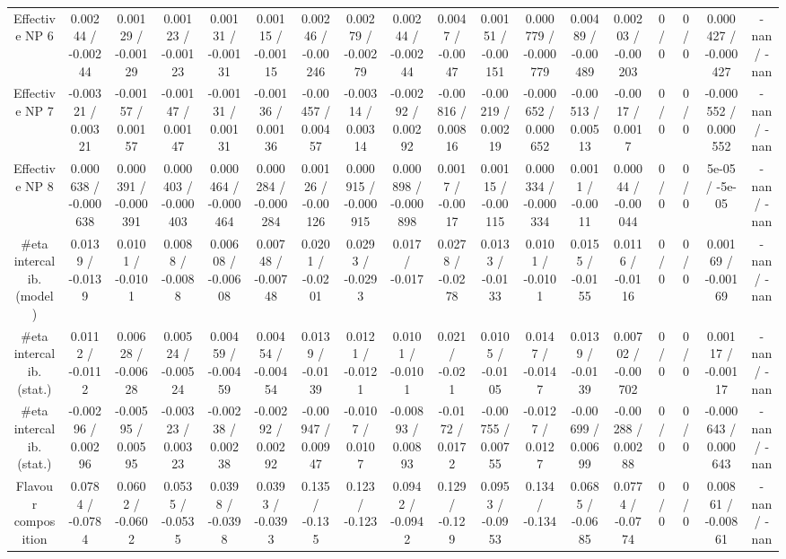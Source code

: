 \documentclass[10pt]{article}
\begin{document}
\begin{table}[htbp]
\begin{center}
\begin{tabular}{|c|c|c|c|c|c|c|c|c|c|c|c|c|c|c|c|c|c|}
  Effective NP 6 & 0.00244 / -0.00244 & 0.00129 / -0.00129 & 0.00123 / -0.00123 & 0.00131 / -0.00131 & 0.00115 / -0.00115 & 0.00246 / -0.00246 & 0.00279 / -0.00279 & 0.00244 / -0.00244 & 0.0047 / -0.0047 & 0.00151 / -0.00151 & 0.000779 / -0.000779 & 0.00489 / -0.00489 & 0.00203 / -0.00203 & 0 / 0 & 0 / 0 & 0.000427 / -0.000427 & -nan / -nan \\ 
  Effective NP 7 & -0.00321 / 0.00321 & -0.00157 / 0.00157 & -0.00147 / 0.00147 & -0.00131 / 0.00131 & -0.00136 / 0.00136 & -0.00457 / 0.00457 & -0.00314 / 0.00314 & -0.00292 / 0.00292 & -0.00816 / 0.00816 & -0.00219 / 0.00219 & -0.000652 / 0.000652 & -0.00513 / 0.00513 & -0.0017 / 0.0017 & 0 / 0 & 0 / 0 & -0.000552 / 0.000552 & -nan / -nan \\ 
  Effective NP 8 & 0.000638 / -0.000638 & 0.000391 / -0.000391 & 0.000403 / -0.000403 & 0.000464 / -0.000464 & 0.000284 / -0.000284 & 0.00126 / -0.00126 & 0.000915 / -0.000915 & 0.000898 / -0.000898 & 0.0017 / -0.0017 & 0.00115 / -0.00115 & 0.000334 / -0.000334 & 0.0011 / -0.0011 & 0.00044 / -0.00044 & 0 / 0 & 0 / 0 & 5e-05 / -5e-05 & -nan / -nan \\ 
  #eta intercalib. (model) & 0.0139 / -0.0139 & 0.0101 / -0.0101 & 0.0088 / -0.0088 & 0.00608 / -0.00608 & 0.00748 / -0.00748 & 0.0201 / -0.0201 & 0.0293 / -0.0293 & 0.017 / -0.017 & 0.0278 / -0.0278 & 0.0133 / -0.0133 & 0.0101 / -0.0101 & 0.0155 / -0.0155 & 0.0116 / -0.0116 & 0 / 0 & 0 / 0 & 0.00169 / -0.00169 & -nan / -nan \\ 
  #eta intercalib. (stat.) & 0.0112 / -0.0112 & 0.00628 / -0.00628 & 0.00524 / -0.00524 & 0.00459 / -0.00459 & 0.00454 / -0.00454 & 0.0139 / -0.0139 & 0.0121 / -0.0121 & 0.0101 / -0.0101 & 0.021 / -0.021 & 0.0105 / -0.0105 & 0.0147 / -0.0147 & 0.0139 / -0.0139 & 0.00702 / -0.00702 & 0 / 0 & 0 / 0 & 0.00117 / -0.00117 & -nan / -nan \\ 
  #eta intercalib. (stat.) & -0.00296 / 0.00296 & -0.00595 / 0.00595 & -0.00323 / 0.00323 & -0.00238 / 0.00238 & -0.00292 / 0.00292 & -0.00947 / 0.00947 & -0.0107 / 0.0107 & -0.00893 / 0.00893 & -0.0172 / 0.0172 & -0.00755 / 0.00755 & -0.0127 / 0.0127 & -0.00699 / 0.00699 & -0.00288 / 0.00288 & 0 / 0 & 0 / 0 & -0.000643 / 0.000643 & -nan / -nan \\ 
  Flavour composition & 0.0784 / -0.0784 & 0.0602 / -0.0602 & 0.0535 / -0.0535 & 0.0398 / -0.0398 & 0.0393 / -0.0393 & 0.135 / -0.135 & 0.123 / -0.123 & 0.0942 / -0.0942 & 0.129 / -0.129 & 0.0953 / -0.0953 & 0.134 / -0.134 & 0.0685 / -0.0685 & 0.0774 / -0.0774 & 0 / 0 & 0 / 0 & 0.00861 / -0.00861 & -nan / -nan \\ 

\end{tabular}
\end{center}
\end{table}
\end{document}
